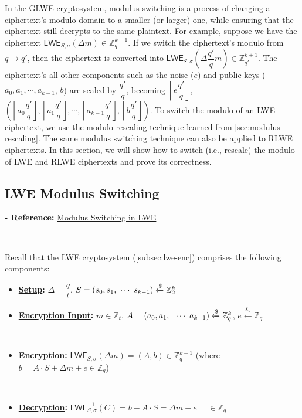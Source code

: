 In the GLWE cryptosystem, modulus switching is a process of changing a ciphertext's modulo domain to a smaller (or larger) one, while ensuring that the ciphertext still decrypts to the same plaintext. For example, suppose we have the ciphertext $\textsf{LWE}_{S, \sigma}(\Delta m) \in \mathbb{Z}_q^{k+1}$. If we switch the ciphertext's modulo from $q \rightarrow q'$, then the ciphertext is converted into $\textsf{LWE}_{S, \sigma}\left(\Delta\dfrac{q'}{q} m\right) \in \mathbb{Z}_{q'}^{k+1}$. The ciphertext's all other components such as the noise ($e$) and public keys ($a_0, a_1, \cdots, a_{k-1}$, $b$) are scaled by $\dfrac{q'}{q}$, becoming $\left\lceil e\dfrac{q'}{q} \right\rfloor$, $\left(\left\lceil a_0\dfrac{q'}{q}\right\rfloor, \left\lceil a_1\dfrac{q'}{q}\right\rfloor, \cdots, \left\lceil a_{k-1}\dfrac{q'}{q}\right\rfloor, \left\lceil b\dfrac{q'}{q}\right\rfloor\right)$. To switch the modulo of an LWE ciphertext, we use the modulo rescaling technique learned from \autoref{sec:modulus-rescaling}. 
The same modulus switching technique can also be applied to RLWE ciphertexts. In this section, we will show how to switch (i.e., rescale) the modulo of LWE and RLWE ciphertexts and prove its correctness.  


\subsection{LWE Modulus Switching}
\label{subsec:modulus-switch-lwe}

\textbf{- Reference:} 
\href{https://www.jeremykun.com/2022/07/16/modulus-switching-in-lwe/}{Modulus Switching in LWE}

$ $

Recall that the LWE cryptosystem (\autoref{subsec:lwe-enc}) comprises the following components:

\begin{itemize}
\item \textbf{\underline{Setup}:} $\Delta = \dfrac{q}{t}$, \text{ } $S = (s_0, s_1, \text{ } \text{$\cdots$} \text{ } s_{k-1}) \xleftarrow{\$} \mathbb{Z}_2^{k}$

\item \textbf{\underline{Encryption Input}:} $m \in \mathbb{Z}_t$, \text{ } $A = (a_0, a_1, \text{ } \text{ } \text{$\cdots$} \text{ } a_{k-1}) \xleftarrow{\$} \mathbb{Z}_q^{k}$, \text{ } $e \xleftarrow{\chi_\sigma} \mathbb{Z}_q$

$ $

\item \textbf{\underline{Encryption}:} $\textsf{LWE}_{S,\sigma}(\Delta  m) = (A, b) \in \mathbb{Z}_q^{k + 1}$ \text{ } (where $b = A \cdot S + \Delta  m + e \in \mathbb{Z}_q$)

$ $

\item \textbf{\underline{Decryption}:} $\textsf{LWE}^{-1}_{S,\sigma}(C) = b - A\cdot S = \Delta  m + e \text{ } \text{ } \in \mathbb{Z}_q$

\end{itemize}

